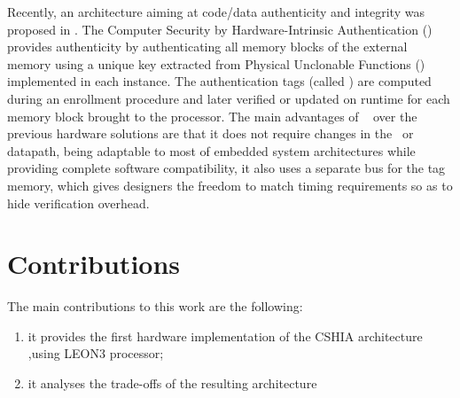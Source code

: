 Recently, an architecture aiming at code/data authenticity and integrity was proposed in \cite{Hoffman2015}. The Computer Security by Hardware-Intrinsic Authentication (\cshia) provides authenticity by authenticating all memory blocks of the external memory using a unique key extracted from Physical Unclonable Functions (\pufs) implemented in each instance. The authentication tags (called \ptags) are computed during an enrollment procedure and later verified or updated on runtime for each memory block brought to the processor. The main advantages of \cshia~ over the previous hardware solutions are that it does not require changes in the \isa~or datapath, being adaptable to most of embedded system architectures while providing complete software compatibility, it also uses a separate bus for the tag memory, which gives designers the freedom to match timing requirements so as to hide verification overhead.







\section{Contributions}
\label{sec:contributions}
The main contributions to this work are the following: 
\begin{enumerate}[label=(\alph*)]
    \item it provides the first hardware implementation of the CSHIA architecture ,using LEON3 processor;
    \item it analyses the trade-offs of the resulting architecture 
\end{enumerate}


